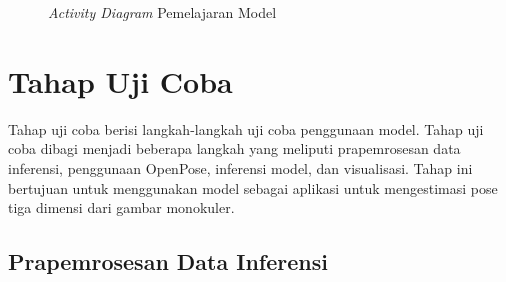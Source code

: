 \begin{figure}[htbp]
    \begin{center}
    \end{center}
    \vspace{-20pt}
    \captionsetup{labelfont=bf, textfont=bf}
    \caption{\textit{Activity Diagram} Pemelajaran Model}
    \vspace{-10pt}
    \captionsetup{labelfont=md, textfont=md}
    \label{fig:learning}
\end{figure}

\section{Tahap Uji Coba} \label{sec:3-TahapUjiCoba}

Tahap uji coba berisi langkah-langkah uji coba penggunaan model.
Tahap uji coba dibagi menjadi beberapa langkah yang meliputi prapemrosesan data inferensi,
penggunaan OpenPose, inferensi model, dan visualisasi. Tahap ini bertujuan untuk menggunakan model
sebagai aplikasi untuk mengestimasi pose tiga dimensi dari gambar monokuler.

\subsection{Prapemrosesan Data Inferensi}


